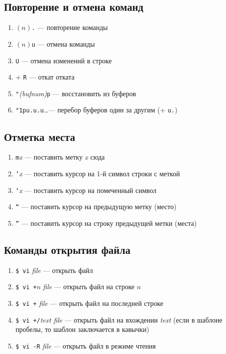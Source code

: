 \documentclass[a4paper,10pt, twocolumn]{article}
\newcommand*{\cod}[1]{\texttt{#1}}
\begin{document}
\subsection{Повторение и отмена команд}
\begin{enumerate}
    \item $(n)$\cod{.} --- повторение команды
    \item $(n)$\cod{u} --- отмена команды 
    \item \cod{U} --- отмена изменений в строке
    \item \Ctrl + \cod{R} --- откат отката
    \item \cod{"}\textit{(bufnum)}\cod{p} --- восстановить из буферов
    \item \cod{"1pu.u.u}\dots --- перебор буферов один за другим (+ \cod{u.}) 
\end{enumerate}

\subsection{Отметка места}
\begin{enumerate}
    \item \cod{m}\textit{x} --- поставить метку \textit{x} сюда
    \item \cod{'}\textit{x} --- поставить курсор на 1-й символ строки с меткой
    \item \cod{`}\textit{x} --- поставить курсор на помеченный символ
    \item \cod{``} --- поставить курсор на предыдущую метку (место)
    \item \cod{''} --- поставить курсор на строку предыдущей метки (места)
\end{enumerate}


\subsection{Команды открытия файла}
\begin{enumerate}
    \item \cod{\$ vi} \textit{file} --- открыть файл
    \item \cod{\$ vi +}$n$ \textit{file} --- открыть файл на строке $n$
    \item \cod{\$ vi +} \textit{file} --- открыть файл на последней строке
    \item \cod{\$ vi +/}\textit{text file} --- открыть файл на вхождении \textit{text}
    (если в шаблоне пробелы, то шаблон заключается в кавычки)
    \item \cod{\$ vi -R} \textit{file} --- открыть файл в режиме чтения
\end{enumerate}
\end{document}
